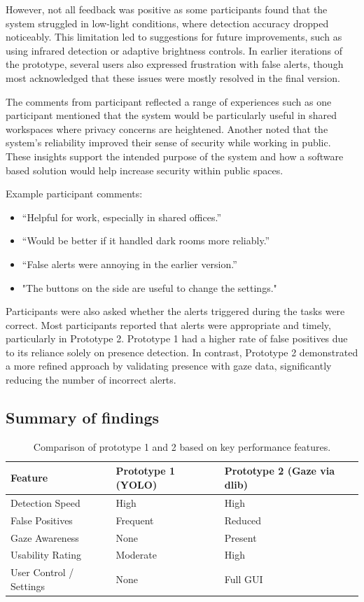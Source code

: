 \documentclass[12pt]{article}
\theoremstyle{plain}
\theoremstyle{definition}
\begin{document}
However, not all feedback was positive as some participants found that the system struggled in low-light conditions, where detection accuracy dropped noticeably. This limitation led to suggestions for future improvements, such as using infrared detection or adaptive brightness controls. In earlier iterations of the prototype, several users also expressed frustration with false alerts, though most acknowledged that these issues were mostly resolved in the final version.

The comments from participant reflected a range of experiences such as one participant mentioned that the system would be particularly useful in shared workspaces where privacy concerns are heightened. Another noted that the system’s reliability improved their sense of security while working in public. These insights support the intended purpose of the system and how a software based solution would help increase security within public spaces.

Example participant comments:

\begin{itemize}
    \item “Helpful for work, especially in shared offices.”
    \item “Would be better if it handled dark rooms more reliably.”
    \item “False alerts were annoying in the earlier version.”
    \item "The buttons on the side are useful to change the settings."
\end{itemize}

Participants were also asked whether the alerts triggered during the tasks were correct. Most participants reported that alerts were appropriate and timely, particularly in Prototype 2. Prototype 1 had a higher rate of false positives due to its reliance solely on presence detection. In contrast, Prototype 2 demonstrated a more refined approach by validating presence with gaze data, significantly reducing the number of incorrect alerts.


\subsection{Summary of findings}
\label{findings_summary}

\begin{table}[h]
\centering
\begin{tabular}{|l|l|l|}
\hline
\textbf{Feature} & \textbf{Prototype 1 (YOLO)} & \textbf{Prototype 2 (Gaze via dlib)} \\
\hline
Detection Speed & High & High \\
False Positives & Frequent & Reduced \\
Gaze Awareness & None & Present \\
Usability Rating & Moderate & High \\
User Control / Settings & None & Full GUI \\
\hline
\end{tabular}
\caption{Comparison of prototype 1 and 2 based on key performance features.}
\label{tab:prototype_comparison}
\end{table}
\end{document}
